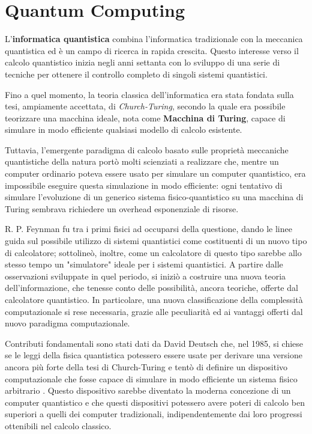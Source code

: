 \chapter{Quantum Computing}
L'\textbf{informatica quantistica} combina l'informatica tradizionale con la meccanica quantistica ed è un campo di ricerca in rapida crescita. Questo interesse verso il calcolo quantistico inizia negli anni settanta con lo sviluppo di una serie di tecniche per ottenere il controllo completo di singoli sistemi quantistici. 

Fino a quel momento, la teoria classica dell'informatica era stata fondata sulla tesi, ampiamente accettata, di \textit{Church-Turing}, secondo la quale era possibile teorizzare una macchina ideale, nota come \textbf{Macchina di Turing}, capace di simulare in modo efficiente qualsiasi modello di calcolo esistente.

Tuttavia, l'emergente paradigma di calcolo basato sulle proprietà meccaniche quantistiche della natura portò molti scienziati a realizzare che, mentre un computer ordinario poteva essere usato per simulare un computer quantistico, era impossibile eseguire questa simulazione in modo efficiente: ogni tentativo di simulare l'evoluzione di un generico sistema fisico-quantistico su una macchina di Turing sembrava richiedere un overhead esponenziale di risorse.

R. P. Feynman fu tra i primi fisici ad occuparsi della questione, dando le linee guida sul possibile utilizzo di sistemi quantistici come costituenti di un nuovo tipo di calcolatore; sottolineò, inoltre, come un calcolatore di questo tipo sarebbe allo stesso tempo un "simulatore" ideale per i sistemi quantistici. A partire dalle osservazioni sviluppate in quel periodo, si iniziò a costruire una nuova teoria dell'informazione, che tenesse conto delle possibilità, ancora teoriche, offerte dal calcolatore quantistico. In particolare, una nuova classificazione della complessità computazionale si rese necessaria, grazie alle peculiarità ed ai vantaggi offerti dal nuovo paradigma computazionale.

Contributi fondamentali sono stati dati da David Deutsch che, nel 1985, si chiese se le leggi della fisica quantistica potessero essere usate per derivare una versione ancora più forte della tesi di Church-Turing e tentò di definire un dispositivo computazionale che fosse capace di simulare in modo efficiente un sistema fisico arbitrario \cite{deutsch1985quantum}. Questo dispositivo sarebbe diventato la moderna concezione di un computer quantistico e che questi dispositivi potessero avere poteri di calcolo ben superiori a quelli dei computer tradizionali, indipendentemente dai loro progressi ottenibili nel calcolo classico.

